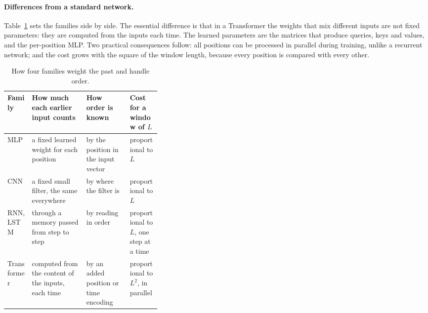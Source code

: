 \paragraph{Differences from a standard network.} Table~\ref{tab:transformer-vs} sets the families side by side.
The essential difference is that in a Transformer the weights that mix different inputs are not fixed parameters:
they are computed from the inputs each time. The learned parameters are the matrices that produce queries, keys and
values, and the per-position MLP. Two practical consequences follow: all positions can be processed in parallel
during training, unlike a recurrent network; and the cost grows with the square of the window length, because every
position is compared with every other.

\begin{table}[!htbp]
\centering\footnotesize
\caption{How four families weight the past and handle order.}
\label{tab:transformer-vs}
\begin{tabularx}{\linewidth}{>{\raggedright\arraybackslash}p{0.16\linewidth}>{\raggedright\arraybackslash}X>{\raggedright\arraybackslash}X>{\raggedright\arraybackslash}p{0.2\linewidth}}
\toprule
Family & How much each earlier input counts & How order is known & Cost for a window of $L$ \\
\midrule
MLP & a fixed learned weight for each position & by the position in the input vector & proportional to $L$ \\
CNN & a fixed small filter, the same everywhere & by where the filter is & proportional to $L$ \\
RNN, LSTM & through a memory passed from step to step & by reading in order & proportional to $L$, one step at a time \\
Transformer & computed from the content of the inputs, each time & by an added position or time encoding & proportional to $L^2$, in parallel \\
\bottomrule
\end{tabularx}
\end{table}

